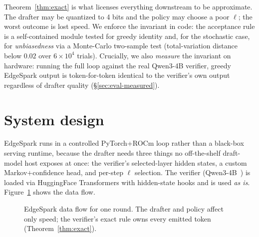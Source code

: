 \documentclass[11pt]{article}
\theoremstyle{plain}
\theoremstyle{definition}
\begin{document}
Theorem~\ref{thm:exact} is what licenses everything downstream to be approximate.
The drafter may be quantized to 4 bits and the policy may choose a poor $\ell$;
the worst outcome is lost speed. We enforce the invariant in code: the
acceptance rule is a self-contained module tested for greedy identity and, for
the stochastic case, for \emph{unbiasedness} via a Monte-Carlo two-sample test
(total-variation distance below $0.02$ over $6\times10^4$ trials). Crucially, we
also \emph{measure} the invariant on hardware: running the full loop against the
real Qwen3-4B verifier, greedy EdgeSpark output is token-for-token identical to
the verifier's own output regardless of drafter quality (\S\ref{sec:eval-measured}).

\section{System design}
\label{sec:system}
EdgeSpark runs in a controlled PyTorch+ROCm loop rather than a black-box serving
runtime, because the drafter needs three things no off-the-shelf draft-model host
exposes at once: the verifier's selected-layer hidden states, a custom
Markov$+$confidence head, and per-step $\ell$ selection. The verifier
(Qwen3-4B~\citep{qwen3}) is loaded via HuggingFace Transformers with hidden-state
hooks and is used \emph{as is}. Figure~\ref{fig:arch} shows the data flow.

\begin{figure}[t]
\centering
{}
\caption{EdgeSpark data flow for one round. The drafter and policy affect only
speed; the verifier's exact rule owns every emitted token
(Theorem~\ref{thm:exact}).}
\label{fig:arch}
\end{figure}
\end{document}
